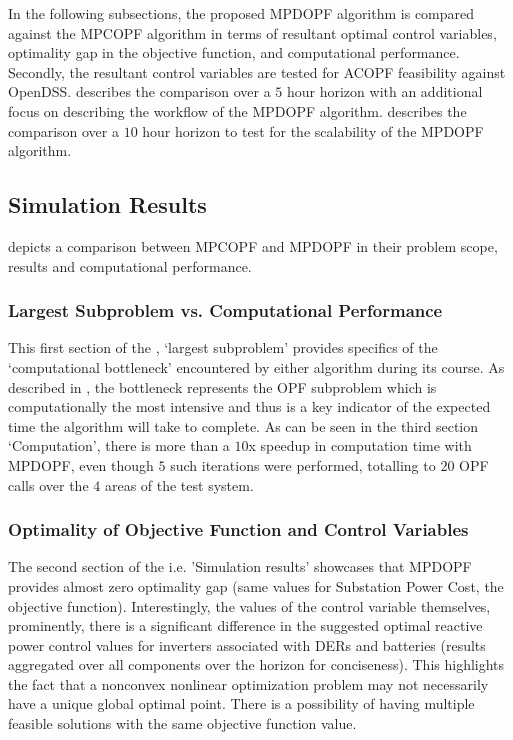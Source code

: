 \documentclass[../../outputs/main.tex]{subfiles}
\begin{document}
In the following subsections, the proposed MPDOPF algorithm is compared against the MPCOPF algorithm in terms of resultant optimal control variables, optimality gap in the objective function, and computational performance. Secondly, the resultant control variables are tested for ACOPF feasibility against OpenDSS.  describes the comparison over a $5$ hour horizon with an additional focus on describing the workflow of the MPDOPF algorithm.  describes the comparison over a $10$ hour horizon to test for the scalability of the MPDOPF algorithm.


\subsection{Simulation Results} \label{subsec:simulationResults}


 depicts a comparison between MPCOPF and MPDOPF in their problem scope, results and computational performance.

\subsubsection{Largest Subproblem vs. Computational Performance}
This first section of the , `largest subproblem' provides specifics of the `computational bottleneck' encountered by either algorithm during its course. As described in , the bottleneck represents the OPF subproblem which is computationally the most intensive and thus is a key indicator of the expected time the algorithm will take to complete. As can be seen in the third section `Computation', there is more than a $10$x speedup in computation time with MPDOPF, even though $5$ such iterations were performed, totalling to $20$ OPF calls over the $4$ areas of the test system.      

\subsubsection{Optimality of Objective Function and Control Variables}
The second section of the  i.e. 'Simulation results' showcases that MPDOPF provides almost zero optimality gap (same values for Substation Power Cost, the objective function). Interestingly, the values of the control variable themselves, prominently, there is a significant difference in the suggested optimal reactive power control values for inverters associated with DERs and batteries (results aggregated over all components over the horizon for conciseness). This highlights the fact that a nonconvex nonlinear optimization problem may not necessarily have a unique global optimal point. There is a possibility of having multiple feasible solutions with the same objective function value. 
\end{document}
